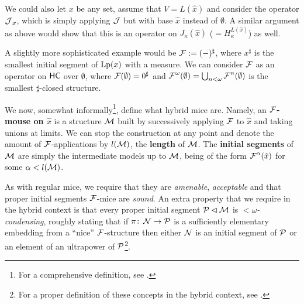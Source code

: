 \documentclass[../../main]{subfiles}
\begin{document}
\qquad We could also let $x$ be any set, assume that $V=L(\hat x)$ and consider the operator $\J_x$, which is simply applying $\J$ but with base $\hat x$ instead of $\emptyset$. A similar argument as above would show that this is an operator on $J_\kappa(\hat x)$ ($=H_\kappa^{L(\hat x)}$) as well.

\qquad A slightly more sophisticated example would be $\F := (-)^\sharp$, where $x^\sharp$ is the smallest initial segment of $\lp(x)$ with a measure. We can consider $\F$ as an operator on $\hc$ over $\emptyset$, where $\F(\emptyset) = 0^\sharp$ and $\F^\omega(\emptyset) = \bigcup_{n<\omega}\F^n(\emptyset)$ is the smallest $\sharp$-closed structure.


We now, somewhat informally\footnote{For a comprehensive definition, see \cite[Section 2]{SchlutzenbergTrang}.}, define what hybrid mice are. Namely, an \textbf{$\F$-mouse on $\hat x$} is a structure $\M$ built by successively applying $\F$ to $\hat x$ and taking unions at limits. We can stop the construction at any point and denote the amount of $\F$-applications by $l(\M)$, the \textbf{length} of $\M$. The \textbf{initial segments} of $\M$ are simply the intermediate models up to $\M$, being of the form $\F^\alpha(\hat x)$ for some $\alpha<l(\M)$.

\qquad As with regular mice, we require that they are \textit{amenable}, \textit{acceptable} and that proper initial segments $\F$-mice are \textit{sound}. An extra property that we require in the hybrid context is that every proper initial segment $\P\pinit\M$ is \textit{${<}\omega$-condensing}, roughly stating that if $\pi\colon\N\to\P$ is a sufficiently elementary embedding from a ``nice'' $\F$-structure then either $\N$ is an initial segment of $\P$ or an element of an ultrapower of $\P$\footnote{For a proper definition of these concepts in the hybrid context, see \cite[Section 2]{SchlutzenbergTrang}.}.


\end{document}
